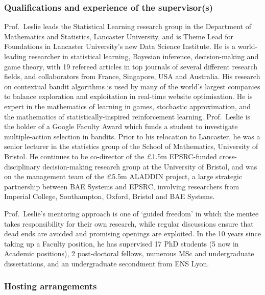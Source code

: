 \documentclass[a4paper,11pt]{article}
\renewcommand{\cite}{\autocite} %
\begin{document}
\subsubsection*{Qualifications and experience of the supervisor(s)}

Prof.\ Leslie leads the Statistical Learning research group in the Department of Mathematics and Statistics, Lancaster University, and is Theme Lead for Foundations in Lancaster University's new Data Science Institute.  He is a world-leading researcher in statistical learning, Bayesian inference, decision-making and game theory, with 19 refereed articles in top journals of several different research fields, and collaborators from France, Singapore, USA and Australia.  His research on contextual bandit algorithms \cite{MayEtAl2012} is used by many of the world's largest companies to balance exploration and exploitation in real-time website optimisation.  He is expert in the mathematics of learning in games, \cite{LeslieCollins03,LeslieCollins05,LeslieCollins06,ChapmanEtAl2013,PerkinsLeslie2014} stochastic approximation, \cite{LeslieCollins03,PerkinsLeslie2012,PerkinsLeslie2014} and the mathematics of statistically-inspired reinforcement learning. \cite{LeslieCollins05,LarsenEtAl2010}  Prof.\ Leslie is the holder of a Google Faculty Award which funds a student to investigate multiple-action selection in bandits.  Prior to his relocation to Lancaster, he was a senior lecturer in the statistics group of the School of Mathematics, University of Bristol.  He continues to be co-director of the \pounds1.5m EPSRC-funded cross-disciplinary decision-making research group at the University of Bristol, and was on the management team of the \pounds5.5m ALADDIN project, a large strategic partnership between BAE Systems and EPSRC, involving researchers from Imperial College, Southampton, Oxford, Bristol and BAE Systems.

Prof.\ Leslie's mentoring approach is one of `guided freedom' in which the mentee takes responsibility for their own research, while regular discussions ensure that dead ends are avoided and promising openings are exploited.  In the 10 years since taking up a Faculty position, he has supervised 17 PhD students (5 now in Academic positions), 2 post-doctoral fellows, numerous MSc and undergraduate dissertations, and an undergraduate secondment from ENS Lyon.

\subsubsection*{Hosting arrangements}
\end{document}
